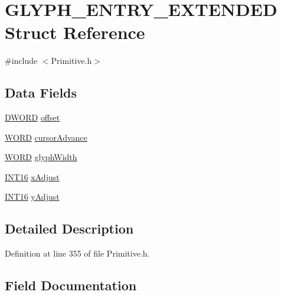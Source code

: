\hypertarget{struct_g_l_y_p_h___e_n_t_r_y___e_x_t_e_n_d_e_d}{}\section{G\+L\+Y\+P\+H\+\_\+\+E\+N\+T\+R\+Y\+\_\+\+E\+X\+T\+E\+N\+D\+E\+D Struct Reference}
\label{struct_g_l_y_p_h___e_n_t_r_y___e_x_t_e_n_d_e_d}


{\ttfamily \#include $<$Primitive.\+h$>$}

\subsection*{Data Fields}
\begin{DoxyCompactItemize}
\item 
\hyperlink{_generic_type_defs_8h_ad342ac907eb044443153a22f964bf0af}{D\+W\+O\+R\+D} \hyperlink{struct_g_l_y_p_h___e_n_t_r_y___e_x_t_e_n_d_e_d_aa414452cfb615ee753a4ced47690a897}{offset}
\item 
\hyperlink{_generic_type_defs_8h_a2b0e863dadf920709ec53d9088ee7c91}{W\+O\+R\+D} \hyperlink{struct_g_l_y_p_h___e_n_t_r_y___e_x_t_e_n_d_e_d_aba3d3c4b7434525acf20373e18ac9570}{cursor\+Advance}
\item 
\hyperlink{_generic_type_defs_8h_a2b0e863dadf920709ec53d9088ee7c91}{W\+O\+R\+D} \hyperlink{struct_g_l_y_p_h___e_n_t_r_y___e_x_t_e_n_d_e_d_a2e4c535ef196015edbe6e57f2dc3a629}{glyph\+Width}
\item 
\hyperlink{_generic_type_defs_8h_ad87465075f24df28ef66f25e43f0bd5a}{I\+N\+T16} \hyperlink{struct_g_l_y_p_h___e_n_t_r_y___e_x_t_e_n_d_e_d_a6d1e1af82a14cbb07a9d1dd2400f643f}{x\+Adjust}
\item 
\hyperlink{_generic_type_defs_8h_ad87465075f24df28ef66f25e43f0bd5a}{I\+N\+T16} \hyperlink{struct_g_l_y_p_h___e_n_t_r_y___e_x_t_e_n_d_e_d_a647fa89d17c79155806497a02e5812f8}{y\+Adjust}
\end{DoxyCompactItemize}


\subsection{Detailed Description}


Definition at line 355 of file Primitive.\+h.



\subsection{Field Documentation}
\hypertarget{struct_g_l_y_p_h___e_n_t_r_y___e_x_t_e_n_d_e_d_aba3d3c4b7434525acf20373e18ac9570}{}
